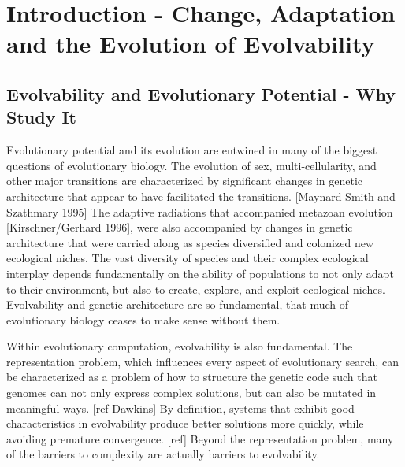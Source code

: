 \section{Introduction - Change, Adaptation and the Evolution of Evolvability}
\subsection{Evolvability and Evolutionary Potential - Why Study It} 
Evolutionary potential and its evolution are entwined in many of the biggest questions of evolutionary biology. The evolution of sex, multi-cellularity, and other major transitions are characterized by significant changes in genetic architecture that appear to have facilitated the transitions. [Maynard Smith and Szathmary 1995] The adaptive radiations that accompanied metazoan evolution [Kirschner/Gerhard 1996], were also accompanied by changes in genetic architecture that were carried along as species diversified and colonized new ecological niches. The vast diversity of species and their complex ecological interplay depends fundamentally on the ability of populations to not only adapt to their environment, but also to create, explore, and exploit ecological niches. Evolvability and genetic architecture are so fundamental, that much of evolutionary biology ceases to make sense without them. 

Within evolutionary computation, evolvability is also fundamental. The representation problem, which influences every aspect of evolutionary search, can be characterized as a problem of how to structure the genetic code such that genomes can not only express complex solutions, but can also be mutated in meaningful ways. [ref Dawkins] By definition, systems that exhibit good characteristics in evolvability produce better solutions more quickly, while avoiding premature convergence. [ref] Beyond the representation problem, many of the barriers to complexity are actually barriers to evolvability.

